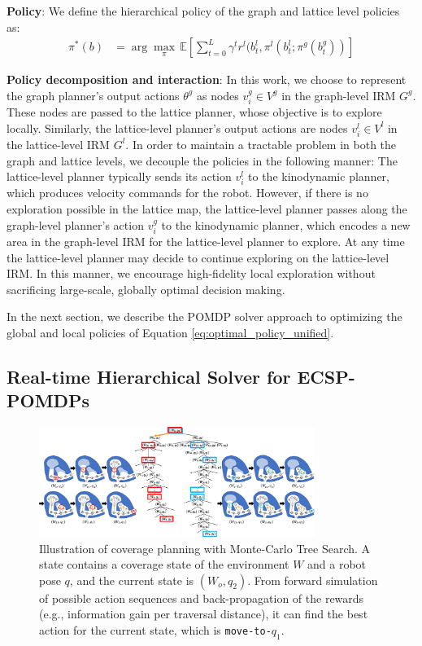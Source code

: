 \documentclass[letterpaper]{article} %
\newcommand{\ph}[1]{{\textbf{#1}:}} %
\begin{document}
\ph{Policy} We define the hierarchical policy of the graph and lattice level policies as:
\begin{align}
  \pi^{*}(b) &= \arg\max_\pi \, \mathbb{E} \left[ \sum_{t=0}^{L} \gamma^t r^l(b^l_t, \pi^l(b^l_t; \pi^g(b^g_t)) \right]
  \label{eq:optimal_policy_unified}
\end{align}

\ph{Policy decomposition and interaction} In this work, we choose to represent the graph planner's output actions $\theta^g$ as nodes $v^g_i \in V^g$ in the graph-level IRM $G^g$. These nodes are passed to the lattice planner, whose objective is to explore locally. Similarly, the lattice-level planner's output actions are nodes $v^l_i \in V^l$ in the lattice-level IRM $G^l$.  In order to maintain a tractable problem in both the graph and lattice levels, we decouple the policies in the following manner:  The lattice-level planner typically sends its action $v^l_i$ to the kinodynamic planner, which produces velocity commands for the robot.  However, if there is no exploration possible in the lattice map, the lattice-level planner passes along the graph-level planner's action $v^g_i$ to the kinodynamic planner, which encodes a new area in the graph-level IRM for the lattice-level planner to explore.  At any time the lattice-level planner may decide to continue exploring on the lattice-level IRM.  In this manner, we encourage high-fidelity local exploration without sacrificing large-scale, globally optimal decision making.

In the next section, we describe the POMDP solver approach to optimizing the global and local policies of Equation \ref{eq:optimal_policy_unified}.


\subsection{Real-time Hierarchical Solver for ECSP-POMDPs}



\begin{figure}[t!]
  \centering
  \includegraphics[width=0.8\textwidth]{figures/belief_tree_search_policy.pdf} %
  \caption{Illustration of coverage planning with Monte-Carlo Tree Search. A state contains a coverage state of the environment $W$ and a robot pose $q$, and the current state is $(W_o, q_2)$. From forward simulation of possible action sequences and back-propagation of the rewards (e.g., information gain per traversal distance), it can find the best action for the current state, which is \texttt{move-to-$q_1$}.}
  \label{fig:belief-tree-search}
\end{figure}
\end{document}
